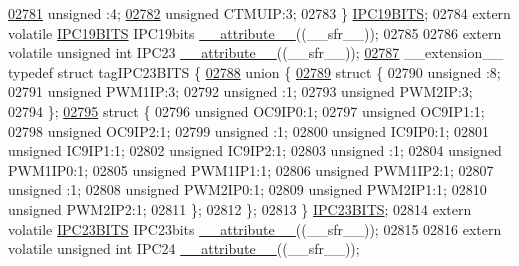 \begin{DoxyCode}
\hypertarget{a00015_source_l02781}{}\hyperlink{a00014_adf71f3d8410c1f1dbbc96680a92c49af}{02781}   \textcolor{keywordtype}{unsigned} :4;
\hypertarget{a00015_source_l02782}{}\hyperlink{a00014_a5c21767b195cc6c804b5ae462d0f721b}{02782}   \textcolor{keywordtype}{unsigned} CTMUIP:3;
02783 \} \hyperlink{a00014_dc/d20/a00534}{IPC19BITS};
02784 \textcolor{keyword}{extern} \textcolor{keyword}{volatile} \hyperlink{a00014_dc/d20/a00534}{IPC19BITS} IPC19bits \hyperlink{a00015_a493c46f03454991ccc5aa7a6e1dfb2a7}{\_\_attribute\_\_}((\_\_sfr\_\_));
02785 
02786 \textcolor{keyword}{extern} \textcolor{keyword}{volatile} \textcolor{keywordtype}{unsigned} \textcolor{keywordtype}{int}  IPC23 \hyperlink{a00015_a493c46f03454991ccc5aa7a6e1dfb2a7}{\_\_attribute\_\_}((\_\_sfr\_\_));
\hypertarget{a00015_source_l02787}{}\hyperlink{a00014}{02787} \_\_extension\_\_ \textcolor{keyword}{typedef} \textcolor{keyword}{struct }tagIPC23BITS \{
\hypertarget{a00015_source_l02788}{}\hyperlink{a00015}{02788}   \textcolor{keyword}{union }\{
\hypertarget{a00015_source_l02789}{}\hyperlink{a00015}{02789}     \textcolor{keyword}{struct }\{
02790       \textcolor{keywordtype}{unsigned} :8;
02791       \textcolor{keywordtype}{unsigned} PWM1IP:3;
02792       \textcolor{keywordtype}{unsigned} :1;
02793       \textcolor{keywordtype}{unsigned} PWM2IP:3;
02794     \};
\hypertarget{a00015_source_l02795}{}\hyperlink{a00015}{02795}     \textcolor{keyword}{struct }\{
02796       \textcolor{keywordtype}{unsigned} OC9IP0:1;
02797       \textcolor{keywordtype}{unsigned} OC9IP1:1;
02798       \textcolor{keywordtype}{unsigned} OC9IP2:1;
02799       \textcolor{keywordtype}{unsigned} :1;
02800       \textcolor{keywordtype}{unsigned} IC9IP0:1;
02801       \textcolor{keywordtype}{unsigned} IC9IP1:1;
02802       \textcolor{keywordtype}{unsigned} IC9IP2:1;
02803       \textcolor{keywordtype}{unsigned} :1;
02804       \textcolor{keywordtype}{unsigned} PWM1IP0:1;
02805       \textcolor{keywordtype}{unsigned} PWM1IP1:1;
02806       \textcolor{keywordtype}{unsigned} PWM1IP2:1;
02807       \textcolor{keywordtype}{unsigned} :1;
02808       \textcolor{keywordtype}{unsigned} PWM2IP0:1;
02809       \textcolor{keywordtype}{unsigned} PWM2IP1:1;
02810       \textcolor{keywordtype}{unsigned} PWM2IP2:1;
02811     \};
02812   \};
02813 \} \hyperlink{a00014_dd/d5a/a00538}{IPC23BITS};
02814 \textcolor{keyword}{extern} \textcolor{keyword}{volatile} \hyperlink{a00014_dd/d5a/a00538}{IPC23BITS} IPC23bits \hyperlink{a00015_a493c46f03454991ccc5aa7a6e1dfb2a7}{\_\_attribute\_\_}((\_\_sfr\_\_));
02815 
02816 \textcolor{keyword}{extern} \textcolor{keyword}{volatile} \textcolor{keywordtype}{unsigned} \textcolor{keywordtype}{int}  IPC24 \hyperlink{a00015_a493c46f03454991ccc5aa7a6e1dfb2a7}{\_\_attribute\_\_}((\_\_sfr\_\_));

\end{DoxyCode}
